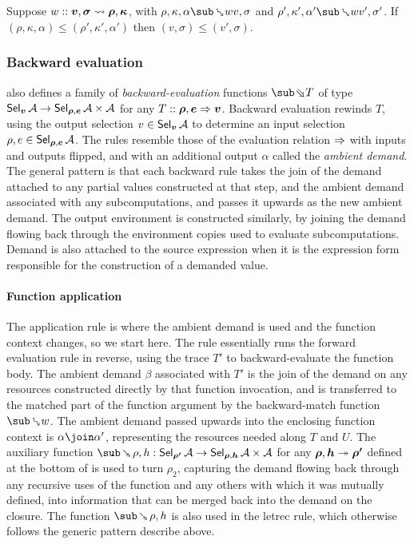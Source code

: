 \begin{lemma}
   Suppose $w :: \bm{v}, \bm{\sigma} \rightsquigarrow \bm{\rho}, \bm{\kappa}$, with $\rho, \kappa, \alpha \matchBwdR{w} v, \sigma$ and $\rho', \kappa', \alpha' \matchBwdR{w} v', \sigma'$. If $(\rho, \kappa, \alpha) \leq (\rho', \kappa', \alpha')$ then $(v, \sigma) \leq (v', \sigma)$.
\end{lemma}

\subsubsection{Backward evaluation}
\label{sec:data-dependencies:analyses:bwd:eval}

 also defines a family of \emph{backward-evaluation} functions $\evalBwdF{T}$ of type $\textup{\textsf{Sel}}_{\bm{v}}\,{\mathcal{A}} \to \textup{\textsf{Sel}}_{\bm{\rho}, \bm{e}}\,{\mathcal{A}} \times \mathcal{A}$ for any $T :: \bm{\rho}, \bm{e} \Rightarrow \bm{v}$. Backward evaluation rewinds $T$, using the output selection $v \in \textup{\textsf{Sel}}_{\bm{v}}\,{\mathcal{A}}$ to determine an input selection $\rho, e \in \textup{\textsf{Sel}}_{\bm{\rho}, \bm{e}}\,{\mathcal{A}}$. The rules resemble those of the evaluation relation $\Rightarrow$ with inputs and outputs flipped, and with an additional output $\alpha$ called the \emph{ambient demand}. The general pattern is that each backward rule takes the join of the demand attached to any partial values constructed at that step, and the ambient demand associated with any subcomputations, and passes it upwards as the new ambient demand. The output environment is constructed similarly, by joining the demand flowing back through the environment copies used to evaluate subcomputations. Demand is also attached to the source expression when it is the expression form responsible for the construction of a demanded value.

\paragraph{Function application} The application rule is where the ambient demand is used and the function context changes, so we start here. The rule essentially runs the forward evaluation rule in reverse, using the trace $T'$ to backward-evaluate the function body. The ambient demand $\beta$ associated with $T'$ is the join of the demand on any resources constructed directly by that function invocation, and is transferred to the matched part of the function argument by the backward-match function $\matchBwdF{w}$. The ambient demand passed upwards into the enclosing function context is $\alpha \join \alpha'$, representing the resources needed along $T$ and $U$. The auxiliary function $\smash{\closeDefsBwdF{\rho, h}}: \smash{\Sel{\raw{\rho'}}{A} \to \Sel{\raw{\rho}, \raw{h}}{A}} \times \Ann{A}$ for any $\bm{\rho}, \bm{h} \twoheadrightarrow \bm{\rho'}$ defined at the bottom of  is used to turn $\rho_2$, capturing the demand flowing back through any recursive uses of the function and any others with which it was mutually defined, into information that can be merged back into the demand on the closure. The function $\closeDefsBwdF{\rho,h}$ is also used in the letrec rule, which otherwise follows the generic pattern describe above.

